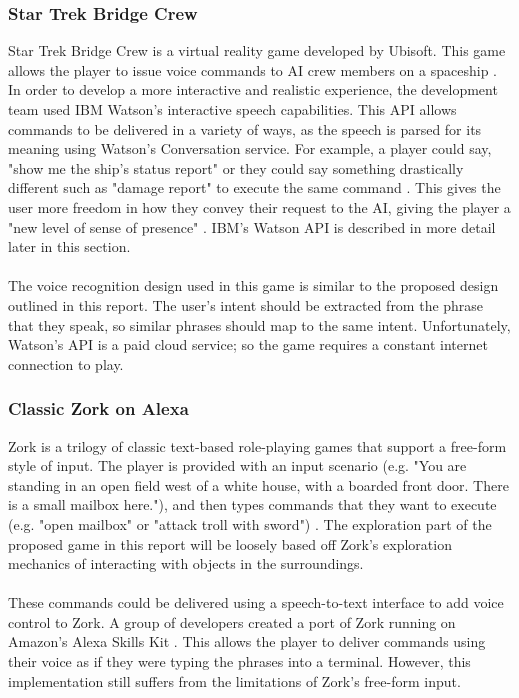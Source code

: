 \documentclass[11pt]{article}
\begin{document}
\subsubsection{Star Trek Bridge Crew}

Star Trek Bridge Crew is a virtual reality game developed by Ubisoft. This game allows the player to issue voice commands to AI crew members on a spaceship \cite{RefWorks:29}. In order to develop a more interactive and realistic experience, the development team used IBM Watson's interactive speech capabilities. This API allows commands to be delivered in a variety of ways, as the speech is parsed for its meaning using Watson's Conversation service. For example, a player could say, "show me the ship's status report" or they could say something drastically different such as "damage report" to execute the same command \cite{RefWorks:25}. This gives the user more freedom in how they convey their request to the AI, giving the player a "new level of sense of presence" \cite{RefWorks:26}. IBM's Watson API is described in more detail later in this section.
\\
\\
The voice recognition design used in this game is similar to the proposed design outlined in this report. The user's intent should be extracted from the phrase that they speak, so similar phrases should map to the same intent. Unfortunately, Watson's API is a paid cloud service; so the game requires a constant internet connection to play.

\subsubsection{Classic Zork on Alexa}

Zork is a trilogy of classic text-based role-playing games that support a free-form style of input. The player is provided with an input scenario (e.g. "You are standing in an open field west of a white house, with a boarded front door. There is a small mailbox here."), and then types commands that they want to execute (e.g. "open mailbox" or "attack troll with sword") \cite{RefWorks:35}. The exploration part of the proposed game in this report will be loosely based off Zork's exploration mechanics of interacting with objects in the surroundings.
\\
\\
These commands could be delivered using a speech-to-text interface to add voice control to Zork. A group of developers created a port of Zork running on Amazon's Alexa Skills Kit \cite{RefWorks:37}. This allows the player to deliver commands using their voice as if they were typing the phrases into a terminal. However, this implementation still suffers from the limitations of Zork's free-form input.
\end{document}
